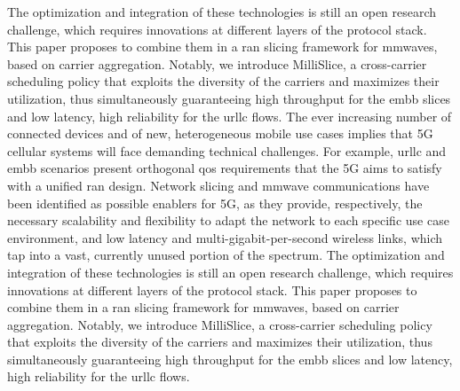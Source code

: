 \documentclass[a4paper, 11pt, oneside]{article}
\begin{document}
  The optimization and integration of these technologies is still an open research challenge, which requires innovations at different layers of the protocol stack. This paper proposes to combine them in a \gls{ran} slicing framework for \glspl{mmwave}, based on carrier aggregation. Notably, we introduce MilliSlice, a cross-carrier scheduling policy that exploits the diversity of the carriers and maximizes their utilization, thus simultaneously guaranteeing high throughput for the \gls{embb} slices and low latency, high reliability for the \gls{urllc} flows.
    The ever increasing number of connected devices and of new, heterogeneous mobile use cases implies that 5G cellular systems will face demanding technical challenges. For example, \gls{urllc} and \gls{embb} scenarios present orthogonal \gls{qos} requirements that the 5G aims to satisfy with a unified \gls{ran} design. Network slicing and \gls{mmwave} communications have been identified as possible enablers for 5G, as they provide, respectively, the necessary scalability and flexibility to adapt the network to each specific use case environment, and low latency and multi-gigabit-per-second wireless links, which tap into a vast, currently unused portion of the spectrum.
  The optimization and integration of these technologies is still an open research challenge, which requires innovations at different layers of the protocol stack. This paper proposes to combine them in a \gls{ran} slicing framework for \glspl{mmwave}, based on carrier aggregation. Notably, we introduce MilliSlice, a cross-carrier scheduling policy that exploits the diversity of the carriers and maximizes their utilization, thus simultaneously guaranteeing high throughput for the \gls{embb} slices and low latency, high reliability for the \gls{urllc} flows.

\cite{muja2012fast}\cite{peker2011binary}



\end{document}
